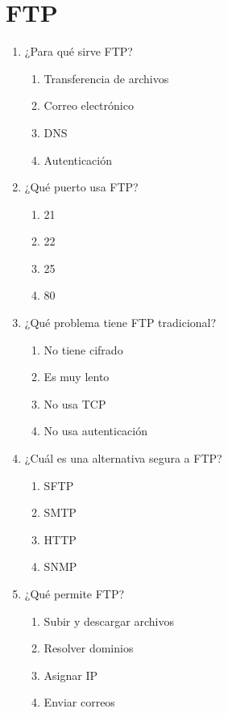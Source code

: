 \documentclass[12pt]{article}
\begin{document}
\section*{FTP}

\begin{enumerate}[label=\textbf{FTP-\arabic*.}]

\item ¿Para qué sirve FTP?
\begin{enumerate}[label=\alph*)]
\item Transferencia de archivos
\item Correo electrónico
\item DNS
\item Autenticación
\end{enumerate}

\item ¿Qué puerto usa FTP?
\begin{enumerate}[label=\alph*)]
\item 21
\item 22
\item 25
\item 80
\end{enumerate}

\item ¿Qué problema tiene FTP tradicional?
\begin{enumerate}[label=\alph*)]
\item No tiene cifrado
\item Es muy lento
\item No usa TCP
\item No usa autenticación
\end{enumerate}

\item ¿Cuál es una alternativa segura a FTP?
\begin{enumerate}[label=\alph*)]
\item SFTP
\item SMTP
\item HTTP
\item SNMP
\end{enumerate}

\item ¿Qué permite FTP?
\begin{enumerate}[label=\alph*)]
\item Subir y descargar archivos
\item Resolver dominios
\item Asignar IP
\item Enviar correos
\end{enumerate}

\end{enumerate}
\end{document}
